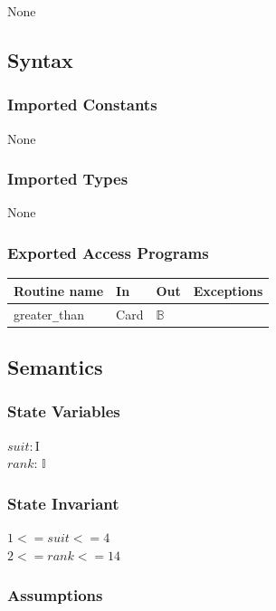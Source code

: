 \documentclass[12pt, titlepage]{article}
\begin{document}
None

\subsection* {Syntax}

\subsubsection* {Imported Constants}

None

\subsubsection* {Imported Types}

None

\subsubsection* {Exported Access Programs}

\begin{tabular}{| l | l | l | p{5cm} |}
\hline
\textbf{Routine name} & \textbf{In} & \textbf{Out} & \textbf{Exceptions}\\
\hline
greater\verb|_|than & Card & $\mathbb{B}$ &\\
\hline
\end{tabular}

\subsection* {Semantics}

\subsubsection* {State Variables}

$\mathit{suit}: \text{I}$\\
$\mathit{rank}$: $\mathbb{I}$

\subsubsection* {State Invariant}

$1 <= \mathit{suit} <= 4$\\
$2 <= \mathit{rank} <= 14$

\subsubsection* {Assumptions}
\end{document}
